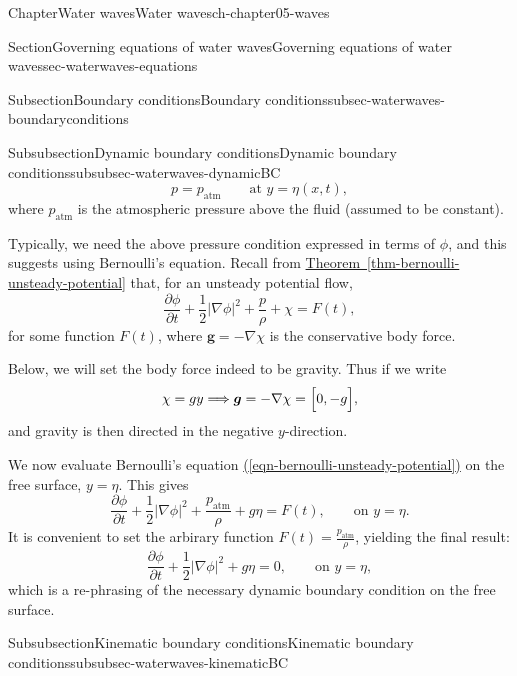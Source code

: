 \documentclass[oneside,10pt,]{book}
\newcommand{\xreffont}{\relax}
\numberwithin{equation}{section}
\newcommand{\pd}[2]{\frac{\partial#1}{\partial#2}}
\newcommand{\bg}{\boldsymbol{g}}
\begin{document}
\begin{chapterptx}{Chapter}{Water waves}{}{Water waves}{}{}{ch-chapter05-waves}
\begin{sectionptx}{Section}{Governing equations of water waves}{}{Governing equations of water waves}{}{}{sec-waterwaves-equations}
\begin{subsectionptx}{Subsection}{Boundary conditions}{}{Boundary conditions}{}{}{subsec-waterwaves-boundaryconditions}
\begin{subsubsectionptx}{Subsubsection}{Dynamic boundary conditions}{}{Dynamic boundary conditions}{}{}{subsubsec-waterwaves-dynamicBC}
\begin{equation}
p = p_{\text{atm}} \qquad \text{at $y = \eta(x, t)$},\label{eqn-waterwaves-pressure}
\end{equation}
where \(p_{\text{atm}}\) is the atmospheric pressure above the fluid (assumed to be constant).%
\par
Typically, we need the above pressure condition expressed in terms of \(\phi\), and this suggests using Bernoulli's equation. Recall from \hyperref[thm-bernoulli-unsteady-potential]{Theorem~{\xreffont\ref{thm-bernoulli-unsteady-potential}}} that, for an unsteady potential flow,%
\begin{equation*}
\pd{\phi}{t} + \frac{1}{2}|\nabla\phi|^2 + \frac{p}{\rho} + \chi = F(t),
\end{equation*}
for some function \(F(t)\), where \(\bg = -\nabla\chi\) is the conservative body force.%
\par
Below, we will set the body force indeed to be gravity. Thus if we write%
\begin{equation*}
\chi = gy \Longrightarrow \bg = -\nabla \chi = \Bigl[0, -g\Bigr],
\end{equation*}
and gravity is then directed in the negative \(y\)-direction.%
\par
We now evaluate Bernoulli's equation \hyperref[eqn-bernoulli-unsteady-potential]{({\xreffont\ref{eqn-bernoulli-unsteady-potential}})} on the free surface, \(y = \eta\). This gives%
\begin{equation*}
\pd{\phi}{t} + \frac{1}{2}|\nabla\phi|^2 + \frac{p_{\text{atm}}}{\rho} + g\eta = F(t), \qquad \text{on $y = \eta$}.
\end{equation*}
It is convenient to set the arbirary function \(F(t) = \frac{p_{\text{atm}}}{\rho}\), yielding the final result:%
\begin{equation*}
\pd{\phi}{t} + \frac{1}{2}|\nabla\phi|^2 + g\eta = 0, \qquad \text{on $y = \eta$},
\end{equation*}
which is a re-phrasing of the necessary dynamic boundary condition on the free surface.%
\end{subsubsectionptx}
%
%
\typeout{************************************************}
\typeout{************************************************}
%
\begin{subsubsectionptx}{Subsubsection}{Kinematic boundary conditions}{}{Kinematic boundary conditions}{}{}{subsubsec-waterwaves-kinematicBC}

\end{subsubsectionptx}
\end{subsectionptx}
\end{sectionptx}
\end{chapterptx}
\end{document}
